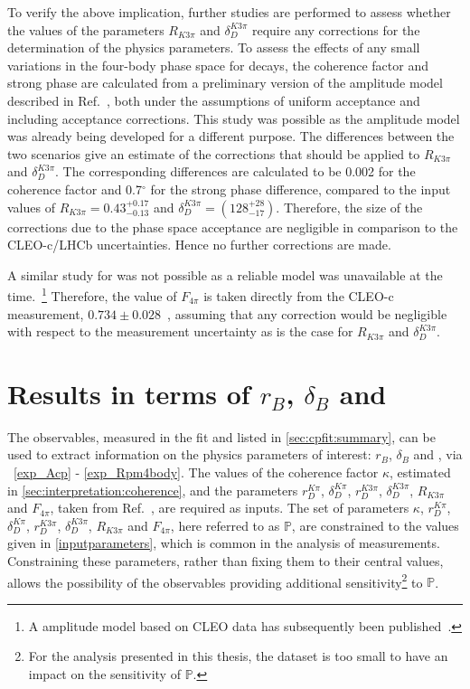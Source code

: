 To verify the above implication, further studies are performed to assess whether the values of the parameters $R_{K3\pi}$ and $\delta_D^{K3\pi}$ require any corrections for the determination of the physics parameters. To assess the effects of any small variations in the four-body phase space for \kpipipi decays, the coherence factor and strong phase are calculated from a preliminary version of the \decay{\Dz}{\Km\pip\pim\pip} amplitude model described in Ref.~\cite{LHCb-PAPER-2017-040}, both under the assumptions of uniform acceptance and including \lhcb acceptance corrections. This study was possible as the \decay{\Dz}{\Km\pip\pim\pip} amplitude model was already being developed for a different purpose. The differences between the two scenarios give an estimate of the corrections that should be applied to $R_{K3\pi}$ and $\delta_D^{K3\pi}$. The corresponding differences are calculated to be 0.002 for the coherence factor and 0.7$^{\circ}$ for the strong phase difference, compared to the input values of $R_{K3\pi} = 0.43^{+0.17}_{-0.13}$ and $\delta_D^{K3\pi} = \left(128^{+28}_{-17}\right)$. Therefore, the size of the corrections due to the \lhcb phase space acceptance are negligible in comparison to the CLEO-c/LHCb uncertainties. Hence no further corrections are made. 

A similar study for \decay{\Dz}{\pim\pip\pim\pip} was not possible as a reliable model was unavailable at the time.~\footnote{A \decay{\Dz}{\pim\pip\pim\pip} amplitude model based on CLEO data has subsequently been published~\cite{4piamplitude}.} Therefore, the value of $F_{4\pi}$ is taken directly from the CLEO-c measurement, $0.734 \pm 0.028$~\cite{charm4pi}, assuming that any correction would be negligible with respect to the measurement uncertainty as is the case for $R_{K3\pi}$ and $\delta_D^{K3\pi}$. 

\section{Results in terms of $r_B$, $\delta_B$ and \Pgamma}
\label{sec:interpretation:gammadini}

The \CP observables, measured in the \CP fit and listed in \sect\ref{sec:cpfit:summary}, can be used to extract information on the physics parameters of interest: $r_B$, $\delta_B$ and \Pgamma, via \eqns~\ref{exp_Acp} - \ref{exp_Rpm4body}. The values of the coherence factor $\kappa$, estimated in \sect\ref{sec:interpretation:coherence}, and the parameters $r_D^{K\pi}$, $\delta_D^{K\pi}$, $r_D^{K3\pi}$, $\delta_D^{K3\pi}$, $R_{K3\pi}$ and $F_{4\pi}$, taken from Ref.~\cite{HFAG,charmk3pi,charmk3pi_errata,LHCb-PAPER-2015-057,charm4pi}, are required as inputs. The set of parameters $\kappa$, $r_D^{K\pi}$, $\delta_D^{K\pi}$, $r_D^{K3\pi}$, $\delta_D^{K3\pi}$, $R_{K3\pi}$ and $F_{4\pi}$, here referred to as $\mathbb{P}$, are constrained to the values given in \tab\ref{inputparameters}, which is common in the analysis of \lhcb measurements. Constraining these parameters, rather than fixing them to their central values, allows the possibility of the \CP observables providing additional sensitivity\footnote{For the analysis presented in this thesis, the dataset is too small to have an impact on the sensitivity of $\mathbb{P}$.} to $\mathbb{P}$.

